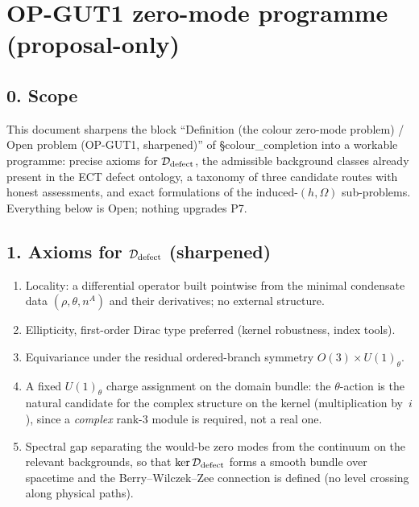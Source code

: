 \section*{OP-GUT1 zero-mode programme (proposal-only)}

\subsection*{0. Scope}
This document sharpens the block ``Definition (the colour
zero-mode problem) / Open problem (OP-GUT1, sharpened)'' of
\S colour\_completion into a workable programme: precise axioms
for $\mathcal D_{\rm defect}$, the admissible background classes
already present in the ECT defect ontology, a taxonomy of three
candidate routes with honest assessments, and exact formulations
of the induced-$(h,\Omega)$ sub-problems.
Everything below is Open; nothing upgrades P7.

\subsection*{1. Axioms for $\mathcal D_{\rm defect}$ (sharpened)}
\begin{enumerate}
  \item Locality: a differential operator built pointwise from the
    minimal condensate data $(\rho,\theta,n^A)$ and their
    derivatives; no external structure.
  \item Ellipticity, first-order Dirac type preferred (kernel
    robustness, index tools).
  \item Equivariance under the residual ordered-branch symmetry
    $O(3)\times U(1)_\theta$.
  \item A fixed $U(1)_\theta$ charge assignment on the domain
    bundle: the $\theta$-action is the natural candidate for the
    complex structure on the kernel (multiplication by~$i$), since
    a \emph{complex} rank-3 module is required, not a real one.
  \item Spectral gap separating the would-be zero modes from the
    continuum on the relevant backgrounds, so that
    $\ker\mathcal D_{\rm defect}$ forms a smooth bundle over
    spacetime and the Berry--Wilczek--Zee connection is defined
    (no level crossing along physical paths).
\end{enumerate}

